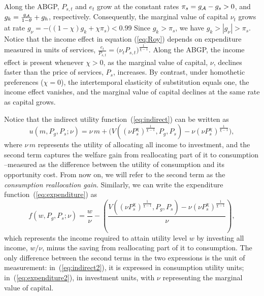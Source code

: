 \documentclass[12pt,a4paper]{article}
\begin{document}
Along the ABGP, $P_{s,t}$ and $e_t$ grow at the constant rates $\pi_s = g_{{\cal A}} - g_s > 0$, and $g_k =  \frac{g_{\cal A}}{1 - \theta} + g_h$, respectively.
Consequently, the marginal value of capital $\nu_t$ grows at rate $g_\nu = -\big( (1-\chi)g_k + \chi \pi_s \big) <0$.99
Since $g_k > \pi_s$, we have $g_k > |g_\nu| > \pi_s$. 
Notice that the income effect in equation (\ref{eq:Roy}) depends on expenditure measured in units of services,  $\frac{e_t}{P_{s,t}} = \big(\nu_tP_{s,t}\big)^{\frac{1}{\chi-1}}$.
Along the ABGP, the income effect is present whenever \( \chi > 0 \), as the marginal value of capital, \( \nu \), declines faster than the price of services, \( P_s \), increases. By contrast, under homothetic preferences (\( \chi = 0 \)), the intertemporal elasticity of substitution equals one, the income effect vanishes, and the marginal value of capital declines at the same rate as capital grows.

Notice that the indirect utility function~(\ref{eq:indirect}) can be written as
\begin{equation}\label{eq:indirect2}
u(m, P_{g}, P_{s}; \nu) = \nu\, m + \Bigg(
V\left( \left( \nu P_{s}^\chi \right)^{\frac{1}{\chi - 1}}, P_{g}, P_{s} \right)
- \nu \left( \nu P_{s}^\chi \right)^{\frac{1}{\chi - 1}} \Bigg),
\end{equation}
where $\nu\, m$ represents the utility of allocating all income to investment, and the second term captures the welfare gain from reallocating part of it to consumption --measured as the difference between the utility of consumption and its opportunity cost. 
From now on, we will refer to the second term as the {\it consumption reallocation gain}.  
Similarly, we can write the expenditure function~(\ref{eq:expenditure}) as
\begin{equation}\label{eq:expenditure2}
f(w, P_{g}, P_{s}; \nu) = 
\frac{w}{\nu} - \left(
\frac{ V\left( \left( \nu P_{s}^\chi \right)^{\frac{1}{\chi - 1}}, P_{g}, P_{s} \right) -  \nu \left( \nu P_{s}^\chi \right)^{\frac{1}{\chi - 1}}}{\nu}
 \right),
\end{equation}
which represents the income required to attain utility level $w$ by investing all income, $w/\nu$, minus the saving from reallocating part of it to consumption.  
The only difference between the second terms in the two expressions is the unit of measurement: in~(\ref{eq:indirect2}), it is expressed in consumption utility units; in~(\ref{eq:expenditure2}), in investment units, with $\nu$ representing the marginal value of capital.
\end{document}
